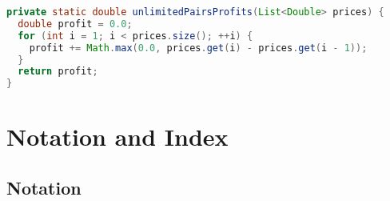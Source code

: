 \documentclass[10pt,openany,twoside,letterpaper,extrafontsizes]{memoir}
\newif\ifPython
\newcommand{\blueboxheight}{10}
\begin{document}
\begin{Spacing}{\honorsSpacing}
\begin{lstlisting}[language=Java]
private static double unlimitedPairsProfits(List<Double> prices) {
  double profit = 0.0;
  for (int i = 1; i < prices.size(); ++i) {
    profit += Math.max(0.0, prices.get(i) - prices.get(i - 1));
  }
  return profit;
}
\end{lstlisting}
\fi%
\ifPython
\begin{lstlisting}[language=Python]
def max_k_pairs_profits(prices, k):
    if not k:
        return 0.0
    elif 2 * k >= len(prices):
        return sum(max(0, b - a) for a, b in zip(prices[:-1], prices[1:]))
    min_prices, max_profits = [float('inf')] * k, [0] * k
    for price in prices:
        for i in reversed(list(range(k))):
            max_profits[i] = max(max_profits[i], price - min_prices[i])
            min_prices[i] = min(min_prices[i], price -
                                (0 if i == 0 else max_profits[i - 1]))
    return max_profits[-1]
\end{lstlisting}
\fi%

\ansend

\end{Spacing}

\part{\partpadding Notation and Index}

\renewcommand{\blueboxheight}{8}
\renewcommand{\indexname}{Notation}
\chapter*{Notation}
\renewcommand{\blueboxheight}{10}
\end{document}
